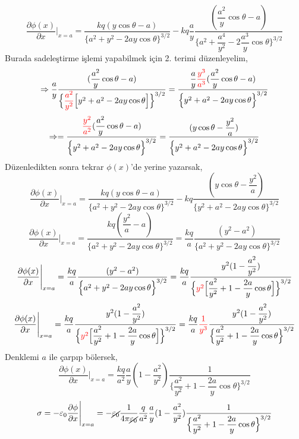 \begin{theorem}
\[ \dfrac{\partial \phi (x)}{\partial x} \Bigg|_{x=a} = \dfrac{kq ( y \cos \theta -a ) }{\Big\{ a^{2} + y^{2} - 2ay \cos \theta \Big\}^{3/2}} - k q \dfrac{a}{y} \dfrac{(\dfrac{a^{2}}{y} \cos \theta - a)}{ \Big\{ a^{2} + \dfrac{a^{4}}{y^{2}}- 2 \dfrac{a^{3}}{y} \cos \theta \Big\}^{3/2}}  \]
Burada sadeleştirme işlemi yapabilmek için 2. terimi düzenleyelim,
\[  \Rightarrow \dfrac{a}{y} \dfrac{(\dfrac{a^{2}}{y} \cos \theta - a)}{ \Big\{ \begingroup \color{red}  \dfrac{a^{2}}{y^{2}} \endgroup \Big[ y^{2} + a^{2} - 2 a y \cos \theta \Big] \Big\}^{3/2}} = \dfrac{ \dfrac{a}{y}  \begingroup \color{red}  \dfrac{y^{3}}{a^{3}} \endgroup (\dfrac{a^{2}}{y} \cos \theta - a)}{ \Big\{ y^{2} + a^{2} - 2 a y \cos \theta \Big\}^{3/2}}  \]
\[  \Rightarrow = \dfrac{  \begingroup \color{red}  \dfrac{y^{2}}{a^{2}} \endgroup (\dfrac{a^{2}}{y} \cos \theta - a)}{ \Big\{  y^{2} + a^{2} - 2 a y \cos \theta \Big\}^{3/2}} =\dfrac{ ( y \cos \theta - \dfrac{y^{2}}{a})}{ \Big\{  y^{2} + a^{2} - 2 a y \cos \theta \Big\}^{3/2}} \]
Düzenledikten sonra tekrar $\phi(x)$'de yerine yazarsak,
\[ \dfrac{\partial \phi (x)}{\partial x} \Bigg|_{x=a} = \dfrac{kq ( y \cos \theta -a ) }{\Big\{ a^{2} + y^{2} - 2ay \cos \theta \Big\}^{3/2}} - k q \dfrac{ ( y \cos \theta - \dfrac{y^{2}}{a})}{ \Big\{  y^{2} + a^{2} - 2 a y \cos \theta \Big\}^{3/2}} \]
\[ \dfrac{\partial \phi (x)}{\partial x} \Bigg|_{x=a} = \dfrac{kq ( \dfrac{y^{2}}{a} -a ) }{\Big\{ a^{2} + y^{2} - 2ay \cos \theta \Big\}^{3/2}} = \dfrac{kq}{a}  \dfrac{( y^{2} -a^{2} ) }{\Big\{ a^{2} + y^{2} - 2ay \cos \theta \Big\}^{3/2}}  \]
\[ \dfrac{\partial \phi (x)}{\partial x} \Bigg|_{x=a} = \dfrac{kq}{a}  \dfrac{( y^{2} -a^{2} ) }{\Big\{ a^{2} + y^{2} - 2ay \cos \theta \Big\}^{3/2}} = \dfrac{kq}{a}  \dfrac{y^{2} ( 1 - \dfrac{a^{2}}{y^{2}}) }{\Big\{ \begingroup \color{red} y^{2} \endgroup  \Big[ \dfrac{a^{2}}{y^{2}} + 1 - \dfrac{2a}{y} \cos \theta \Big] \Big\}^{3/2}}  \]
\[ \dfrac{\partial \phi (x)}{\partial x} \Bigg|_{x=a} = \dfrac{kq}{a}  \dfrac{y^{2} ( 1 - \dfrac{a^{2}}{y^{2}}) }{\Big\{ \begingroup \color{red} y^{2} \endgroup \Big[ \dfrac{a^{2}}{y^{2}} + 1 - \dfrac{2a}{y} \cos \theta \Big] \Big\}^{3/2}} =  \dfrac{kq}{a}  \begingroup \color{red} \dfrac{1}{y^{3}} \endgroup \dfrac{y^{2} ( 1 - \dfrac{a^{2}}{y^{2}}) }{\Big\{ \dfrac{a^{2}}{y^{2}} + 1 - \dfrac{2a}{y} \cos \theta \Big\}^{3/2}} \]
Denklemi $a$ ile çarpıp bölersek,
\[ \dfrac{\partial \phi (x)}{\partial x} \Bigg|_{x=a} =  \dfrac{kq}{a^{2}}  \dfrac{a}{y}  ( 1 - \dfrac{a^{2}}{y^{2}}) \dfrac{1}{\Big\{ \dfrac{a^{2}}{y^{2}} + 1 - \dfrac{2a}{y} \cos \theta \Big\}^{3/2}}  \]
\[ \sigma = - \varepsilon_{0} \dfrac{\partial \phi}{\partial x} \Bigg|_{x=a} = - \cancel{\varepsilon_{0}}  \dfrac{1}{4 \pi \cancel{\varepsilon_{0}}}  \dfrac{q}{a^{2}}  \dfrac{a}{y}  ( 1 - \dfrac{a^{2}}{y^{2}}) \dfrac{1}{\Big\{ \dfrac{a^{2}}{y^{2}} + 1 - \dfrac{2a}{y} \cos \theta \Big\}^{3/2}}   \]

\end{theorem}

